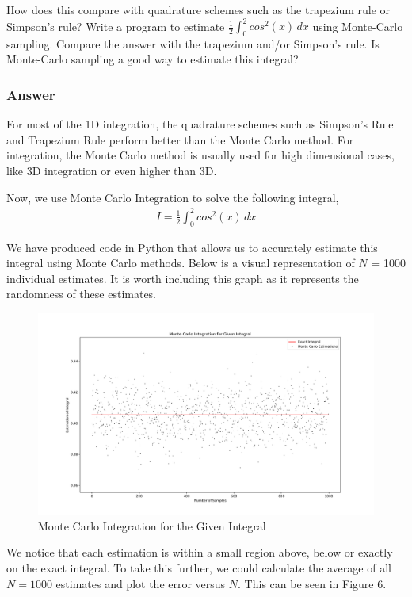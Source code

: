 \documentclass[12pt]{article}
\begin{document}
How does this compare with quadrature schemes such as the trapezium rule or Simpson’s rule? Write a program to estimate $\frac{1}{2}\int_{0}^{2} cos^2(x) \,dx$ using Monte-Carlo sampling. Compare the answer with the trapezium and/or Simpson’s rule. Is Monte-Carlo sampling a good way to estimate this integral?

\subsubsection*{Answer}

For most of the 1D integration, the quadrature schemes such as Simpson's Rule and Trapezium Rule perform better than the Monte Carlo method. For integration, the Monte Carlo method is usually used for high dimensional cases, like 3D integration or even higher than 3D. \par

Now, we use Monte Carlo Integration to solve the following integral,
\begin{align}
I = \frac{1}{2}\int_{0}^{2} cos^2(x) \,dx
\end{align}

We have produced code in Python that allows us to accurately estimate this integral using Monte Carlo methods. Below is a visual representation of $N$ = 1000 individual estimates. It is worth including this graph as it represents the randomness of these estimates. 
 
\begin{figure}[h!]
  \includegraphics[scale=0.35, center]{HW1}
  \caption{Monte Carlo Integration for the Given Integral}
  \label{fig:mc_randomness}
\end{figure}


We notice that each estimation is within a small region above, below or exactly on the exact integral. To take this further, we could calculate the average of all $N = 1000$ estimates and plot the error versus $N$. This can be seen in Figure 6.
\end{document}
